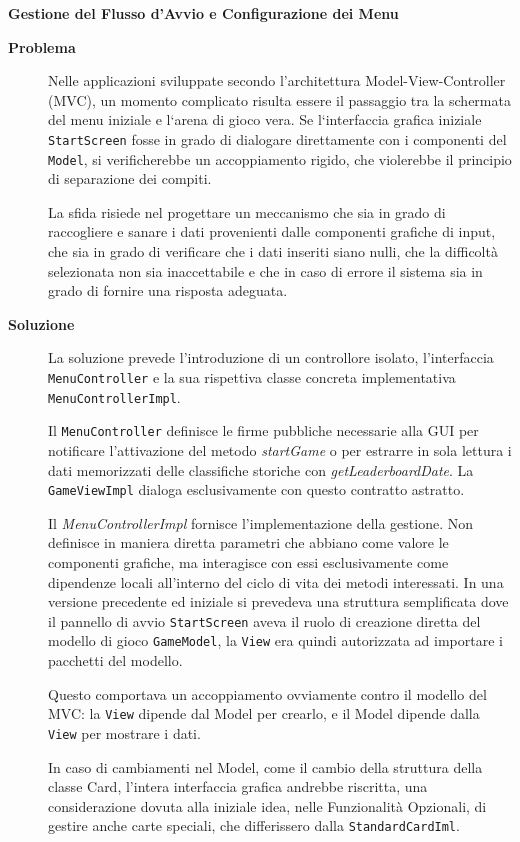 \documentclass[a4paper,12pt]{report}
\begin{document}
\textbf{Gestione del Flusso d’Avvio e Configurazione dei Menu}
\begin{description}
    \item[\textbf{Problema}] 
    Nelle applicazioni sviluppate secondo l’architettura Model-View-Controller (MVC), un momento complicato risulta essere il passaggio tra la schermata del menu iniziale e l`arena di gioco vera.
    Se l`interfaccia grafica iniziale \texttt{StartScreen} fosse in grado di dialogare direttamente con i componenti del \texttt{Model}, si verificherebbe un accoppiamento rigido, che violerebbe il principio di separazione dei compiti.
    
    La sfida risiede nel progettare un meccanismo che sia in grado di raccogliere e sanare i dati provenienti dalle componenti grafiche di input, che sia in grado di verificare che i dati inseriti siano nulli, che la difficoltà selezionata non sia inaccettabile e che in caso di errore il sistema sia in grado di fornire una risposta adeguata.
    \item[\textbf{Soluzione}] 
    La soluzione prevede l’introduzione di un controllore isolato, l’interfaccia \texttt{MenuController} e la sua rispettiva classe concreta implementativa \texttt{MenuControllerImpl}.

    Il \texttt{MenuController} definisce le firme pubbliche necessarie alla GUI per notificare l'attivazione del metodo  \emph{startGame} o per estrarre in sola lettura i dati memorizzati delle classifiche storiche con \emph{getLeaderboardDate}.
    La \texttt{GameViewImpl} dialoga esclusivamente con questo contratto astratto.
    
    Il \emph{MenuControllerImpl} fornisce l’implementazione della gestione. 
    Non definisce in maniera diretta parametri che abbiano come valore le componenti grafiche, ma interagisce con essi esclusivamente come dipendenze locali all'interno del ciclo di vita dei metodi interessati.
    In una versione precedente ed iniziale si prevedeva una struttura semplificata dove il pannello di avvio \texttt{StartScreen} aveva il ruolo di creazione diretta del modello di gioco \texttt{GameModel}, la \texttt{View} era quindi autorizzata ad importare i pacchetti del modello. 
    
    Questo comportava un accoppiamento ovviamente contro il modello del MVC: la \texttt{View} dipende dal Model per crearlo, e il Model dipende dalla \texttt{View} per mostrare i dati.
    
    In caso di cambiamenti nel Model, come il cambio della struttura della classe Card, l'intera interfaccia grafica andrebbe riscritta, una considerazione dovuta alla iniziale idea, nelle Funzionalità Opzionali, di gestire anche carte speciali, che differissero dalla \texttt{StandardCardIml}.
    

\end{description}
\end{document}
